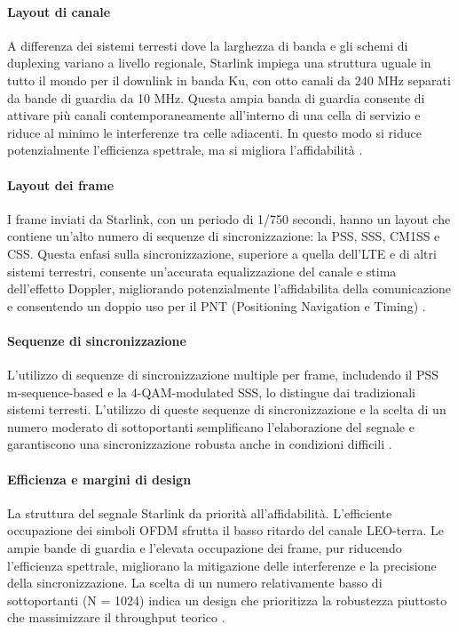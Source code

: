 \paragraph{Layout di canale} A differenza dei sistemi terresti dove la larghezza di banda e gli schemi di duplexing variano a livello regionale, Starlink impiega una struttura uguale in tutto il mondo per il downlink in banda Ku, con otto canali da 240 MHz separati da bande di guardia da 10 MHz.
Questa ampia banda di guardia consente di attivare più canali contemporaneamente all'interno di una cella di servizio e riduce al minimo le interferenze tra celle adiacenti.
In questo modo si riduce potenzialmente l'efficienza spettrale, ma si migliora l'affidabilità \cite{humphreys_signal_2023}.

\paragraph{Layout dei frame}
I frame inviati da Starlink, con un periodo di 1/750 secondi, hanno un layout che contiene un'alto numero di sequenze di sincronizzazione: la PSS, SSS, CM1SS e CSS.
Questa enfasi sulla sincronizzazione, superiore a quella dell'LTE e di altri sistemi terrestri, consente un'accurata equalizzazione del canale e stima dell'effetto Doppler, migliorando potenzialmente l'affidabilita della comunicazione e consentendo un doppio uso per il PNT (Positioning Navigation e Timing) \cite{humphreys_signal_2023}.

\paragraph{Sequenze di sincronizzazione}
L'utilizzo di sequenze di sincronizzazione multiple per frame, includendo il PSS m-sequence-based e la 4-\ac{QAM}-modulated SSS, lo distingue dai tradizionali sistemi terresti.
L'utilizzo di queste sequenze di sincronizzazione e la scelta di un numero moderato di sottoportanti semplificano l'elaborazione del segnale e garantiscono una sincronizzazione robusta anche in condizioni difficili \cite{humphreys_signal_2023}.

\paragraph{Efficienza e margini di design}
La struttura del segnale Starlink da priorità all'affidabilità.
L'efficiente occupazione dei simboli OFDM sfrutta il basso ritardo del canale \ac{LEO}-terra.
Le ampie bande di guardia e l'elevata occupazione dei frame, pur riducendo l'efficienza spettrale, migliorano la mitigazione delle interferenze e la precisione della sincronizzazione.
La scelta di un numero relativamente basso di sottoportanti (N = 1024) indica un design che prioritizza la robustezza piuttosto che massimizzare il throughput teorico \cite{humphreys_signal_2023}.


